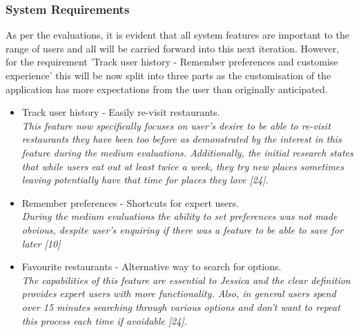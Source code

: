 \documentclass[a4 paper, 12pt]{article}
\begin{document}
    \subsubsection{System Requirements}
    As per the evaluations, it is evident that all system features are important to the range of users and all will be carried forward into this next iteration. However, for the requirement 'Track user history - Remember preferences and customise experience' this will be now split into three parts as the customisation of the application has more expectations from the user than originally anticipated.
        \begin{itemize}
            \item Track user history - Easily re-visit restaurants. \\
            \textit{This feature now specifically focuses on user's desire to be able to re-visit restaurants they have been too before as demonstrated by the interest in this feature during the medium evaluations. Additionally, the initial research states that while users eat out at least twice a week, they try new places sometimes leaving potentially have that time for places they love [24].}
            \item Remember preferences - Shortcuts for expert users. \\
            \textit{During the medium evaluations the ability to set preferences was not made obvious, despite user's enquiring if there was a feature to be able to save for later [10]}            
            \item Favourite restaurants - Alternative way to search for options. \\
            \textit{The capabilities of this feature are essential to Jessica and the clear definition provides expert users with more functionality. Also, in general users spend over 15 minutes searching through various options and don't want to repeat this process each time if avoidable [24].}
        \end{itemize}
   
    
\end{document}
